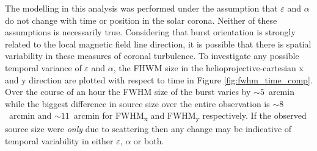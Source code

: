 


The modelling in this analysis was performed under the assumption that $\varepsilon$ and $\alpha$ do not change with time or position in the solar corona. Neither of these assumptions is necessarily true. Considering that burst orientation is strongly related to the local magnetic field line direction, it is possible that there is spatial variability in these measures of coronal turbulence. To investigate any possible temporal variance of $\varepsilon$ and $\alpha$, the FHWM size in the helioprojective-cartesian x and y direction are plotted with respect to time in Figure \ref{fig:fwhm_time_comp}. Over the course of an hour the FWHM size of the burst varies by $\sim 5$~arcmin while the biggest difference in source size over the entire observation is $\sim 8$~arcmin and $\sim 11$~arcmin for FWHM\textsubscript{x} and FWHM\textsubscript{y} respectively. If the observed source size were \textit{only} due to scattering then any change may be indicative of temporal variability in either $\varepsilon$, $\alpha$ or both.

